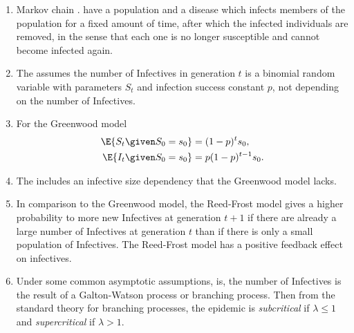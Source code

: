 \documentclass[12pt]{article}
\begin{document}
\begin{enumerate}
    \item
        Markov chain .
        have a population and a disease which infects members of the
        population for a fixed amount of time, after which the infected
        individuals are removed, in the sense that each one is no longer
        susceptible and cannot become infected again.
    \item
        The  assumes the number of Infectives in
        generation \( t \) is a binomial random variable with parameters
        \( S_t \) and infection success constant \( p \), not depending
        on the number of Infectives.
    \item
        For the Greenwood model
        \begin{align*}
            \E{S_t \given S_0= s_0} &= (1-p)^t s_0, \\
            \E{I_t \given S_0= s_0} &= p(1-p)^{t-1} s_{0}.
        \end{align*}
    \item
        The  includes an infective size
        dependency that the Greenwood model lacks.
    \item
        In comparison to the Greenwood model, the Reed-Frost model gives
        a higher probability to more new Infectives at generation \( t+1
        \) if there are already a large number of Infectives at
        generation \( t \) than if there is only a small population of
        Infectives. The Reed-Frost model has a positive feedback effect
        on infectives.
    \item
        Under some common asymptotic assumptions, is, the number of
        Infectives is the result of a Galton-Watson process or branching
        process.  Then from the standard theory for branching processes,
        the epidemic is \emph{subcritical} if \( \lambda \le 1 \) and
        \emph{supercritical} if \( \lambda > 1 \).
\end{enumerate}

\hr

\end{document}
